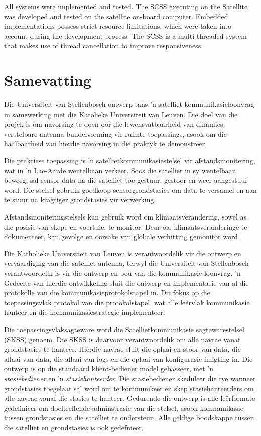 All systems were implemented and tested. The SCSS executing on the Satellite was
developed and tested on the satellite on-board computer. Embedded implementations possess
strict resource limitations, which were taken into account during the development process.
The SCSS is a multi-threaded system that makes use of thread cancellation to improve
responsiveness.


\chapter*{Samevatting}

Die Universiteit van Stellenbosch ontwerp tans 'n satelliet kommunikasieloonvrag in
samewerking met die Katolieke Universiteit van Leuven. Die doel van die projek is om
navorsing te doen oor die lewensvatbaarheid van dinamies verstelbare antenna bundelvorming
vir ruimte toepassings, asook om die haalbaarheid van hierdie navorsing in die praktyk
te demonstreer.

Die praktiese toepassing is 'n satellietkommunikasiestelsel vir afstandsmonitering,
wat in 'n Lae-Aarde wentelbaan verkeer. Soos die satelliet in sy wentelbaan beweeg,
sal sensor data na die satelliet toe gestuur, gestoor en weer aangestuur word. Die
stelsel gebruik goedkoop sensorgrondstasies om data te versamel en aan te stuur na
kragtiger grondstasies vir verwerking.

Afstandsmoniteringstelsels kan gebruik word om klimaatsverandering, sowel as die
posisie van skepe en voertuie, te monitor. Deur oa. klimaatsveranderinge te dokumenteer,
kan gevolge en oorsake van globale verhitting gemonitor word.

Die Katholieke Universiteit van Leuven is verantwoordelik vir die
ontwerp en vervaardiging van die satelliet antenna, terwyl die Universiteit van
Stellenbosch verantwoordelik is vir die ontwerp en bou van die
kommunikasie loonvrag. 'n Gedeelte van hierdie ontwikkeling sluit die
ontwerp en implementasie van al die protokolle van die
kommunikasieprotokolstapel in. Dit fokus op die toepassingsvlak
protokol van die protokolstapel, wat alle le\^{e}rvlak kommunikasie
hanteer en die kommunikasiestrategie implementeer.

Die toepassingsvlaksagteware word die Satellietkommunikasie sagtewarestelsel
(SKSS) genoem. Die SKSS is daarvoor verantwoordelik om alle navrae
vanaf grondstasies te hanteer. Hierdie navrae sluit die
oplaai en stoor van data, die aflaai van data, die aflaai van logs en
die oplaai van konfigurasie inligting in. Die ontwerp is op die standaard
kli\"{e}nt-bediener model gebasseer, met 'n \emph{stasiebediener} en 'n
\emph{stasiehanteerder}. Die stasiebediener skeduleer die tye wanneer
grondstasies toegelaat sal word om te kommunikeer en skep stasiehanteerders om alle
navrae vanaf die stasies te hanteer. Gedurende die ontwerp is alle
le\^{e}rformate gedefinieer om doeltreffende adminstrasie van die
stelsel, asook kommunikasie tussen grondstasies en die satelliet te
ondersteun. Alle geldige boodskappe tussen die satelliet en grondstasies
is ook gedefnieer.

